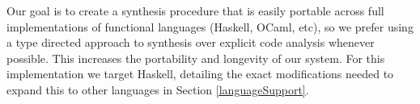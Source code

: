 Our goal is to create a synthesis procedure that is easily portable across full implementations of functional languages (Haskell, OCaml, etc), so we prefer using a type directed approach to synthesis over explicit code analysis whenever possible. This increases the portability and longevity of our system. For this implementation we target Haskell, detailing the exact modifications needed to expand this to other languages in Section \ref{languageSupport}.


